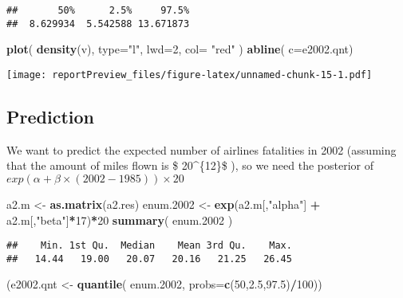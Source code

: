 \documentclass[]{article}
\newenvironment{Shaded}{\begin{snugshade}}{\end{snugshade}}
\newcommand{\KeywordTok}[1]{\textcolor[rgb]{0.13,0.29,0.53}{\textbf{#1}}}
\newcommand{\DataTypeTok}[1]{\textcolor[rgb]{0.13,0.29,0.53}{#1}}
\newcommand{\DecValTok}[1]{\textcolor[rgb]{0.00,0.00,0.81}{#1}}
\newcommand{\FloatTok}[1]{\textcolor[rgb]{0.00,0.00,0.81}{#1}}
\newcommand{\StringTok}[1]{\textcolor[rgb]{0.31,0.60,0.02}{#1}}
\newcommand{\OperatorTok}[1]{\textcolor[rgb]{0.81,0.36,0.00}{\textbf{#1}}}
\newcommand{\NormalTok}[1]{#1}
\begin{document}
\begin{verbatim}
##       50%      2.5%     97.5% 
##  8.629934  5.542588 13.671873
\end{verbatim}

\begin{Shaded}
\begin{Highlighting}[]
\KeywordTok{plot}\NormalTok{( }\KeywordTok{density}\NormalTok{(v), }\DataTypeTok{type=}\StringTok{"l"}\NormalTok{, }\DataTypeTok{lwd=}\DecValTok{2}\NormalTok{, }\DataTypeTok{col=} \StringTok{"red"}\NormalTok{ )}
\KeywordTok{abline}\NormalTok{( }\DataTypeTok{c=}\NormalTok{e2002.qnt)}
\end{Highlighting}
\end{Shaded}

\texttt{[image: reportPreview\_files/figure-latex/unnamed-chunk-15-1.pdf]}

\subsection{Prediction}\label{prediction}

We want to predict the expected number of airlines fatalities in 2002
(assuming that the amount of miles flown is \$ 20\^{}\{12\}\$
), so we need the posterior of
\(exp( \alpha + \beta \times (2002-1985))\times 20\)

\begin{Shaded}
\begin{Highlighting}[]
\NormalTok{a2.m <-}\StringTok{ }\KeywordTok{as.matrix}\NormalTok{(a2.res)}
\NormalTok{enum.}\DecValTok{2002}\NormalTok{ <-}\StringTok{ }\KeywordTok{exp}\NormalTok{(a2.m[,}\StringTok{"alpha"}\NormalTok{] }\OperatorTok{+}\StringTok{ }\NormalTok{a2.m[,}\StringTok{"beta"}\NormalTok{]}\OperatorTok{*}\DecValTok{17}\NormalTok{)}\OperatorTok{*}\DecValTok{20}
\KeywordTok{summary}\NormalTok{( enum.}\DecValTok{2002}\NormalTok{ )}
\end{Highlighting}
\end{Shaded}

\begin{verbatim}
##    Min. 1st Qu.  Median    Mean 3rd Qu.    Max. 
##   14.44   19.00   20.07   20.16   21.25   26.45
\end{verbatim}

\begin{Shaded}
\begin{Highlighting}[]
\NormalTok{(e2002.qnt <-}\StringTok{ }\KeywordTok{quantile}\NormalTok{( enum.}\DecValTok{2002}\NormalTok{, }\DataTypeTok{probs=}\KeywordTok{c}\NormalTok{(}\DecValTok{50}\NormalTok{,}\FloatTok{2.5}\NormalTok{,}\FloatTok{97.5}\NormalTok{)}\OperatorTok{/}\DecValTok{100}\NormalTok{))}
\end{Highlighting}
\end{Shaded}
\end{document}
